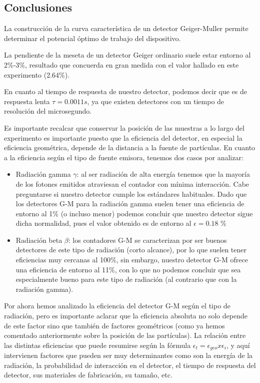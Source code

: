 \documentclass[11pt]{article}
\begin{document}
    \hypertarget{conclusiones}{%
\subsection{Conclusiones}\label{conclusiones}}

La construcción de la curva característica de un detector Geiger-Muller
permite determinar el potencial óptimo de trabajo del dispositivo.

La pendiente de la meseta de un detector Geiger ordinario suele estar
entorno al 2\%-3\%, resultado que concuerda en gran medida con el valor
hallado en este experimento (2.64\%).

En cuanto al tiempo de respuesta de nuestro detector, podemos decir que
es de respuesta lenta \(\tau = 0.0011s\), ya que existen detectores con
un tiempo de resolución del microsegundo.

Es importante recalcar que conservar la posición de las muestras a lo
largo del experimento es importante puesto que la eficiencia del
detector, en especial la eficiencia geométrica, depende de la distancia
a la fuente de partículas. En cuanto a la eficiencia según el tipo de
fuente emisora, tenemos dos casos por analizar:

\begin{itemize}
\item
  Radiación gamma \(\gamma\): al ser radiación de alta energía tenemos
  que la mayoría de los fotones emitidos atraviesan el contador con
  mínima interacción. Cabe preguntarse si nuestro detector cumple los
  estándares habituales. Dado que los detectores G-M para la radiación
  gamma suelen tener una eficiencia de entorno al 1\% (o incluso menor)
  podemos concluir que nuestro detector sigue dicha normalidad, pues el
  valor obtenido es de entorno al \(\epsilon = 0.18\) \%
\item
  Radiación beta \(\beta\): los contadores G-M se caracterizan por ser
  buenos detectores de este tipo de radiación (corto alcance), por lo
  que suelen tener eficiencias muy cercanas al 100\%, sin embargo,
  nuestro detector G-M ofrece una eficiencia de entorno al 11\%, con lo
  que no podemos concluir que sea especialmente bueno para este tipo de
  radiación (al contrario que con la radiación gamma).
\end{itemize}

Por ahora hemos analizado la eficiencia del detector G-M según el tipo
de radiación, pero es importante aclarar que la eficiencia absoluta no
solo depende de este factor sino que también de factores geométricos
(como ya hemos comentado anteriormente sobre la posición de las
partículas). La relación entre las distintas eficiencias que puede
resumirse según la fórmula
\(\epsilon_t = \epsilon_{geo} x \epsilon_{i}\), y aquí intervienen
factores que pueden ser muy determinantes como son la energía de la
radiación, la probabilidad de interacción en el detector, el tiempo de
respuesta del detector, sus materiales de fabricación, su tamaño, etc.
\end{document}
